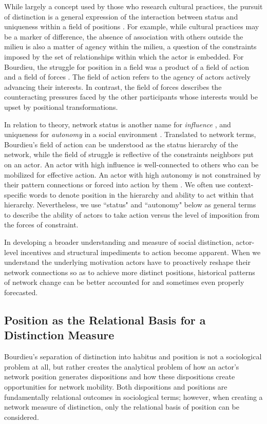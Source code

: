 \documentclass[12pt]{article}
\begin{document}
While largely a concept used by those who research cultural practices, the pursuit of distinction is a general expression of the interaction between status and uniqueness within a field of positions \citep{anheier1995forms}. For example, while cultural practices may be a marker of difference, the absence of association with others outside the milieu is also a matter of agency within the milieu, a question of the constraints imposed by the set of relationships within which the actor is embedded. For Bourdieu, the struggle for position in a field was a product of a field of action and a field of forces \citep{martin2003field}. The field of action refers to the agency of actors actively advancing their interests. In contrast, the field of forces describes the counteracting pressures faced by the other participants whose interests would be upset by positional transformations.   

In relation to theory, network status is another name for \textit{influence} \citep{friedkin1991theoretical}, and uniqueness for \textit{autonomy} in a social environment \citep{burt1980autonomy}. Translated to network terms, Bourdieu's field of action can be understood as the status hierarchy of the network, while the field of struggle is reflective of the constraints neighbors put on an actor. An actor with high influence is well-connected to others who can be mobilized for effective action. An actor with high autonomy is not constrained by their pattern connections or forced into action by them \citep{burt76}. We often use context-specific words to denote position in the hierarchy and ability to act within that hierarchy. Nevertheless, we use ``status" and ``autonomy" below as general terms to describe the ability of actors to take action versus the level of imposition from the forces of constraint.

In developing a broader understanding and measure of social distinction, actor-level incentives and structural impediments to action become apparent. When we understand the underlying motivation actors have to proactively reshape their network connections so as to achieve more distinct positions, historical patterns of network change can be better accounted for and sometimes even properly forecasted. 

\subsection{Position as the Relational Basis for a Distinction Measure}
Bourdieu's separation of distinction into habitus and position is not a sociological problem at all, but rather creates the analytical problem of how an actor's network position generates dispositions and how these dispositions create opportunities for network mobility. Both dispositions and positions are fundamentally relational outcomes in sociological terms; however, when creating a network measure of distinction, only the relational basis of position can be considered. 
\end{document}
